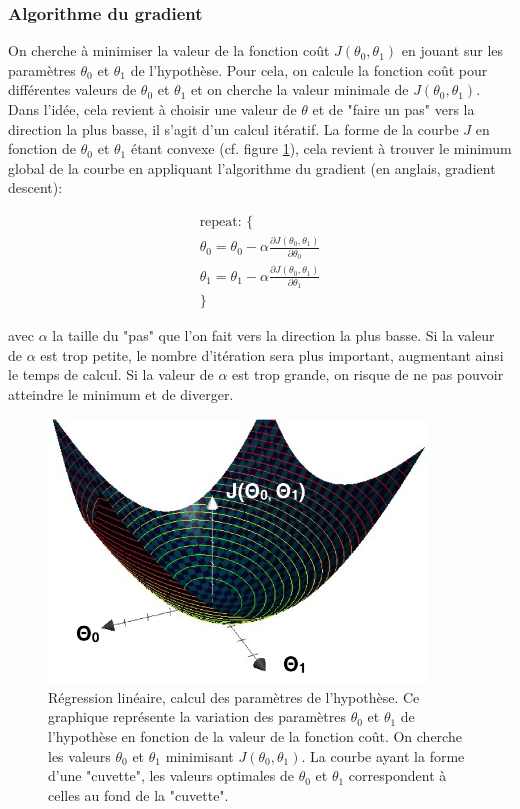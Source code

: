 \subsubsection{Algorithme du gradient}
On cherche à minimiser la valeur de la fonction coût $J(\theta_0,\theta_1)$ en jouant sur les paramètres $\theta_0$ et $\theta_1$ de l'hypothèse. Pour cela, on calcule la fonction coût pour différentes valeurs de $\theta_0$ et $\theta_1$ et on cherche la valeur minimale de $J(\theta_0,\theta_1)$. Dans l'idée, cela revient à choisir une valeur de $\theta$ et de "faire un pas" vers la direction la plus basse, il s'agit d'un calcul itératif. La forme de la courbe $J$ en fonction de  $\theta_0$ et $\theta_1$ étant convexe (cf. figure \ref{fig:Régression linéaire, calcul des paramètres de l'hypothèse}), cela revient à trouver le minimum global de la courbe en appliquant l'algorithme du gradient (en anglais, gradient descent):

\begin{equation}
	\begin{split}
		\text{repeat: \{} \\
		\theta_0 = \theta_0 - \alpha \frac{\partial J(\theta_0,\theta_1)}{\partial\theta_0} \\
		\theta_1 = \theta_1 - \alpha \frac{\partial J(\theta_0,\theta_1)}{\partial\theta_1} \\
		\text{\}}
	\end{split}
\end{equation}

avec $\alpha$ la taille du "pas" que l'on fait vers la direction la plus basse. Si la valeur de $\alpha$ est trop petite, le nombre d'itération sera plus important, augmentant ainsi le temps de calcul. Si la valeur de $\alpha$ est trop grande, on risque de ne pas pouvoir atteindre le minimum et de diverger.  

\begin{figure}[h]
	\centering\includegraphics[height=7cm]{images/gradient.png}
	\caption[Régression linéaire, calcul des paramètres de l'hypothèse]{Régression linéaire, calcul des paramètres de l'hypothèse. Ce graphique représente la variation des paramètres $\theta_0$ et $\theta_1$ de l'hypothèse en fonction de la valeur de la fonction coût. On cherche les valeurs  $\theta_0$ et $\theta_1$ minimisant $J(\theta_0,\theta_1)$. La courbe ayant la forme d'une "cuvette", les valeurs optimales de $\theta_0$ et $\theta_1$ correspondent à celles au fond de la "cuvette".}
	\label{fig:Régression linéaire, calcul des paramètres de l'hypothèse}
\end{figure}
 

